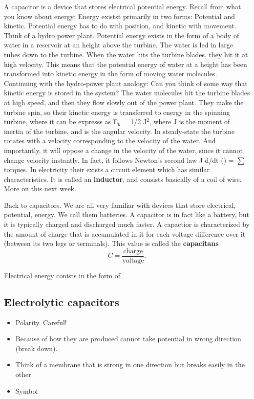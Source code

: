 \documentclass[a4paper]{scrartcl}
\begin{document}
A capacitor is a device that stores electrical potential energy. Recall from what you know about energy: Energy existst primarily in two forms: Potential and kinetic. Potential energy has to do with position, and kinetic with movement. Think of a hydro power plant. Potential energy exists in the form of a body of water in a reservoir at an height above the turbine. The water is led in large tubes down to the turbine. When the water hits the turbine blades, they hit it at high velocity. This means that the potential energy of water at a height has been transformed into kinetic energy in the form of moving water molecules.
Continuing with the hydro-power plant analogy: Can you think of some way that kinetic energy is stored in the system?
The water molecules hit the turbine blades at high speed, and then they flow slowly out of the power plant. They make the turbine spin, so their kinetic energy is transferred to energy in the spinning turbine, where it can be expresss as E$_{\text{k}}$ = 1/2 J\dot{\theta}$^{\text{2}}$, where J is the moment of inertia of the turbine, and \dot{\theta} is the angular velocity. In steady-state the turbine rotates with a velocity corresponding to the velocity of the water. And importantly, it will oppose a change in the velocity of the water, since it cannot change velocity instantly. In fact, it follows Newton's second law J d/dt (\dot{\theta}) = $\sum$ torques. 
In electricity their exists a circuit element which has similar characteristics. It is called an \textbf{inductor}, and consists basically of a coil of wire. More on this next week.

Back to capacitors. We are all very familiar with devices that store electrical, potential, energy. We call them batteries. A capacitor is in fact like a battery, but it is typically charged and discharged much faster. A capactior is characterized by the amount of charge that is accumulated in it for each voltage difference over it (between its two legs or terminals). This value is called the \textbf{capacitans}
\[ C = \frac{\text{charge}}{\text{voltage}}. \]



Electrical energy conists in the form of
\subsection{Electrolytic capacitors}
\label{sec-2-3}
\begin{itemize}
\item Polarity. Careful!
\item Because of how they are produced cannot take potential in wrong direction (break down).
\item Think of a membrane that is strong in one direction but breaks easily in the other
\item Symbol
\end{itemize}
\end{document}
